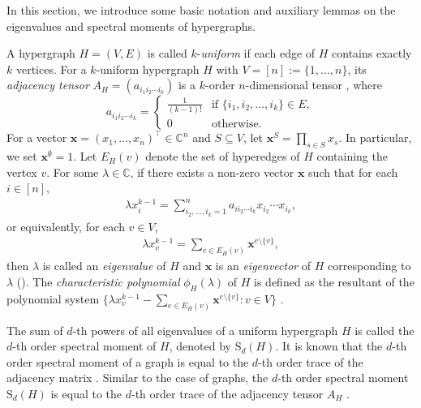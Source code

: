 \documentclass{article}
\begin{document}
In this section,
we introduce some basic notation and auxiliary lemmas on the eigenvalues and spectral moments of hypergraphs.

A hypergraph $H=(V,E)$ is called $k$-\emph{uniform} if each edge of $H$ contains exactly $k$ vertices.
For a $k$-uniform hypergraph $H$ with $V=[n]:=\{1,\ldots,n\}$,
its \emph{adjacency tensor} $A_{H}=(a_{i_{1}i_{2}\cdots i_{k}})$ is a $k$-order $n$-dimensional tensor \cite{cooper2012spectra}, where
\begin{equation*}
a_{i_{1}i_{2}\cdots i_{k}}=\begin{cases}
\frac{1}{(k-1)!}&\text{if $\{i_{1},i_{2},\ldots,i_{k}\}\in E$},\\
0&\text{otherwise}.
\end{cases}
\end{equation*}
For a vector $\mathbf{x}=(x_{1},\ldots,x_{n})^{\top}\in\mathbb{C}^{n}$ and $S \subseteq V$,
let $\mathbf{x}^{S}=\prod_{s \in S}x_{s}$.
In particular,
we set $\mathbf{x}^{\emptyset}=1$.
Let $E_{H}(v)$ denote the set of hyperedges of $H$ containing the vertex $v$.
For some $\lambda \in \mathbb{C}$,
if there exists a non-zero vector $\mathbf{x}$ such that for each $i \in [n]$,
\begin{align*}
\lambda x_{i}^{k-1}=\sum_{i_{2},\ldots,i_{k}=1}^{n}a_{i i_{2} \cdots i_{k}}x_{i_{2}}\cdots x_{i_{k}},
\end{align*}
or equivalently, for each $v\in V$,
\begin{align}\label{eq2}
\lambda x_{v}^{k-1}=\sum_{e \in E_{H}(v)}\mathbf{x}^{e\setminus\{v\}},
\end{align}
then $\lambda$ is called an \emph{eigenvalue} of $H$ and $\mathbf{x}$ is an \emph{eigenvector} of $H$ corresponding to $\lambda$ (\cite{lim2005singular,qi2005eigenvalues}).
The \emph{characteristic polynomial} $\phi_{H}(\lambda)$ of $H$ is defined as the resultant of the polynomial system
$\{ \lambda x_{v}^{k-1}-\sum_{e \in E_{H}(v)}\mathbf{x}^{e\setminus\{v\}} : v \in V \}$ \cite{qi2005eigenvalues}.

The sum of $d$-th powers of all eigenvalues of a uniform hypergraph $H$ is called the $d$-th order spectral moment of $H$,
denoted by $\mathrm{S}_{d}(H)$.
It is known that the $d$-th order spectral moment of a graph is equal to the $d$-th order trace of the adjacency matrix \cite{cvetkovic1980spectra}.
Similar to the case of graphs,
the $d$-th order spectral moment $\mathrm{S}_{d}(H)$ is equal to the $d$-th order trace of the adjacency tensor $A_{H}$ \cite{hu2013determinants}.
\end{document}
